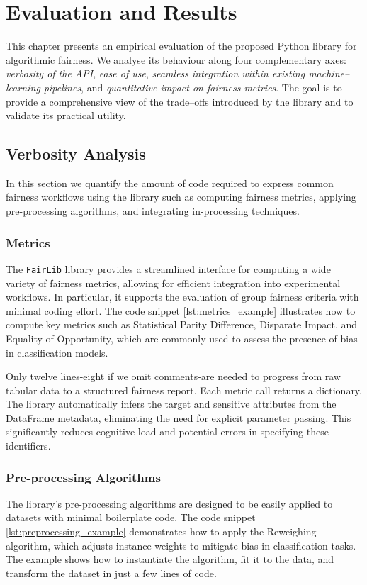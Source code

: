 \documentclass[12pt,a4paper,openright,twoside]{book}
\begin{document}
\chapter{Evaluation and Results}


This chapter presents an empirical evaluation of the proposed Python library for algorithmic fairness. We analyse its behaviour along four complementary axes: \emph{verbosity of the API}, \emph{ease of use}, \emph{seamless integration within existing machine--learning pipelines}, and \emph{quantitative impact on fairness metrics}. The goal is to provide a comprehensive view of the trade--offs introduced by the library and to validate its practical utility.


\section{Verbosity Analysis}
In this section we quantify the amount of code required to express common fairness workflows using the library such as computing fairness metrics, applying pre-processing algorithms, and integrating in-processing techniques. 


\subsection{Metrics}
The \texttt{FairLib} library provides a streamlined interface for computing a wide variety of fairness metrics, allowing for efficient integration into experimental workflows. In particular, it supports the evaluation of group fairness criteria with minimal coding effort. The code snippet \ref{lst:metrics_example} illustrates how to compute key metrics such as Statistical Parity Difference, Disparate Impact, and Equality of Opportunity, which are commonly used to assess the presence of bias in classification models.



Only twelve lines-eight if we omit comments-are needed to progress from raw tabular data to a structured fairness report. Each metric call returns a dictionary. The library automatically infers the target and sensitive attributes from the DataFrame metadata, eliminating the need for explicit parameter passing. This significantly reduces cognitive load and potential errors in specifying these identifiers.

\subsection{Pre-processing Algorithms}
The library's pre-processing algorithms are designed to be easily applied to datasets with minimal boilerplate code. The code snippet \ref{lst:preprocessing_example} demonstrates how to apply the Reweighing algorithm, which adjusts instance weights to mitigate bias in classification tasks. The example shows how to instantiate the algorithm, fit it to the data, and transform the dataset in just a few lines of code.
\end{document}
